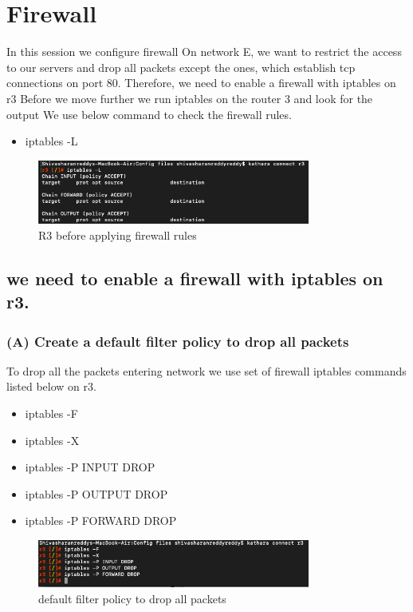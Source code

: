 \section{Firewall}
In this session we configure firewall On network E, we want to restrict the access to our servers and drop all packets except the ones, which establish tcp connections on port 80. Therefore, 
we need to enable a firewall with iptables on r3
Before we move further we run iptables on the router 3 and look for the output 
We use below command to check the firewall rules.
\begin{itemize}
\item iptables -L
\end{itemize}
\begin{figure}[H]
\centering
  \includegraphics[width=0.8\textwidth]{Images/R3 before aplying any firewall rules .png}
  \caption{R3 before applying firewall rules}
  \label{fig }
\end{figure}
\subsection{we need to enable a firewall with iptables on r3.}
\subsubsection{(A) Create a default filter policy to drop all packets}
To drop all the packets entering network we use set of firewall iptables commands listed below on r3.
\begin{itemize}
\item iptables -F
\item iptables -X
\item iptables -P INPUT DROP
\item iptables -P OUTPUT DROP
\item iptables -P FORWARD DROP
\end{itemize}

\begin{figure}[H]
\centering
  \includegraphics[width=0.8\textwidth]{Images/Firewall rules-01.png}
  \caption{  default filter policy to drop all packets}
  \label{fig }
\end{figure}

